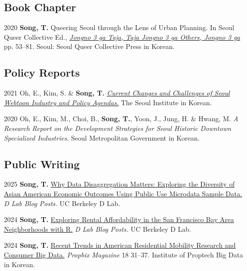 \documentclass[11pt,letterpaper]{article}
\begin{document}
\subsection{Book Chapter}
\begin{tablist}
  \item[2020] \tab{}\textbf{Song, T.} Queering Seoul through the Lens of Urban Planning. In Seoul Queer Collective Ed., \emph{\href{http://www.kyobobook.co.kr/product/detailViewKor.laf?ejkGb=KOR&mallGb=KOR&barcode=9791197096501}{Jongno 3 ga Taja, Taja Jongno 3 ga Others, Jongno 3 ga}} pp. 53–81. Seoul: Seoul Queer Collective Press in Korean.
\end{tablist}

\subsection{Policy Reports}
\begin{tablist}
  \item[2021] \tab{}Oh, E., Kim, S. \& \textbf{Song, T.} \emph{\href{https://www.si.re.kr/bbs/view.do?key=2024100039&pstSn=2111190001}{Current Changes and Challenges of Seoul Webtoon Industry and Policy Agendas.}} The Seoul Institute in Korean.
  \item[2020] \tab{}Oh, E., Kim, M., Choi, B., \textbf{Song, T.}, Yoon, J., Jung, H. \& Hwang, M. \emph{A Research Report on the Development Strategies for Seoul Historic Downtown Specialized Industries.} Seoul Metropolitan Government in Korean.
\end{tablist}

\subsection{Public Writing}
\begin{tablist}
  \item[2025] \tab{}\textbf{Song, T.} \href{https://medium.com/@dlab-berkeley/why-data-disaggregation-matters-exploring-the-diversity-of-asian-american-economic-outcomes-using-8b96e5dcc9a4}{Why Data Disaggregation Matters: Exploring the Diversity of Asian American Economic Outcomes Using Public Use Microdata Sample Data.} \emph{D Lab Blog Posts.} UC Berkeley D Lab.
  \item[2024] \tab{}\textbf{Song, T.} \href{https://medium.com/@dlab-berkeley/exploring-rental-affordability-in-the-san-francisco-bay-area-neighborhoods-with-r-c4383f7553e7}{Exploring Rental Affordability in the San Francisco Bay Area Neighborhoods with R.} \emph{D Lab Blog Posts.} UC Berkeley D Lab.
  \item[2024] \tab{}\textbf{Song, T.} \href{https://www.kahps.org/data/prbx/pdf_44_7}{Recent Trends in American Residential Mobility Research and Consumer Big Data.} \emph{Propbix Magazine} 18 31–37. Institute of Proptech Big Data in Korean.
\end{tablist}
\end{document}
